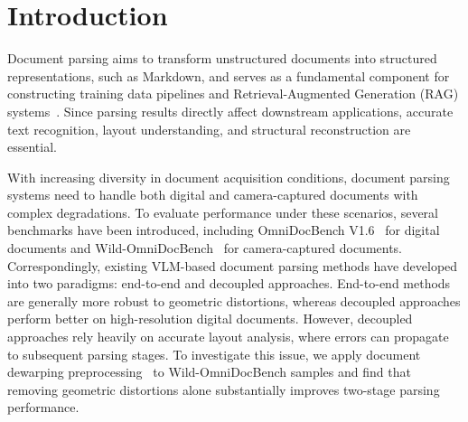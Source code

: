 \documentclass{fairmeta}
\begin{document}
\tableofcontents
\newpage

\section{Introduction}
Document parsing aims to transform unstructured documents into structured representations, such as Markdown, and serves as a fundamental component for constructing training data pipelines and Retrieval-Augmented Generation (RAG) systems~\cite{guo2025rag, wang2025bookrag}. Since parsing results directly affect downstream applications, accurate text recognition, layout understanding, and structural reconstruction are essential.

With increasing diversity in document acquisition conditions, document parsing systems need to handle both digital and camera-captured documents with complex degradations. To evaluate performance under these scenarios, several benchmarks have been introduced, including OmniDocBench V1.6~\cite{wang2026mineru2} for digital documents and Wild-OmniDocBench~\cite{li2026towards} for camera-captured documents. Correspondingly, existing VLM-based document parsing methods have developed into two paradigms: end-to-end and decoupled approaches. End-to-end methods are generally more robust to geometric distortions, whereas decoupled approaches perform better on high-resolution digital documents. However, decoupled approaches rely heavily on accurate layout analysis, where errors can propagate to subsequent parsing stages. To investigate this issue, we apply document dewarping preprocessing~\cite{cai2025forcennet} to Wild-OmniDocBench samples and find that removing geometric distortions alone substantially improves two-stage parsing performance.

\end{document}
